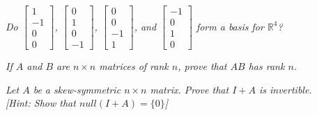 \documentclass[12pt,letterpaper]{hmcpset}
\newcommand\tab[1][1cm]{\hspace*{#1}}
\begin{document}
\newpage


\begin{problem}[3.5.48]
    \textit{Do $\begin{bmatrix} 1 \\ -1 \\ 0\\ 0 \end{bmatrix}$, $\begin{bmatrix} 0 \\ 1 \\ 0\\ -1 \end{bmatrix}$, $\begin{bmatrix} 0 \\ 0 \\ -1\\ 1 \end{bmatrix}$, and $\begin{bmatrix} -1 \\ 0 \\ 1\\ 0 \end{bmatrix}$ form a basis for $\mathbb{R}^4$?}
\end{problem}

\begin{solution}
    
\end{solution}

\newpage


\begin{problem}[3.5.58]
     \textit{If $A$ and $B$ are $n \times n$ matrices of rank $n$, prove that $AB$ has rank $n$.}
\end{problem}

\begin{solution}
    
\end{solution}

\newpage


\begin{problem}[3.5.66 (b)]
    \textit{Let $A$ be a skew-symmetric $n \times n$ matrix. Prove that $I + A$ is invertible.} \\
    \tab \tab \textit{[Hint: Show that $null(I + A) = \{0\}$]}
\end{problem}
\end{document}

